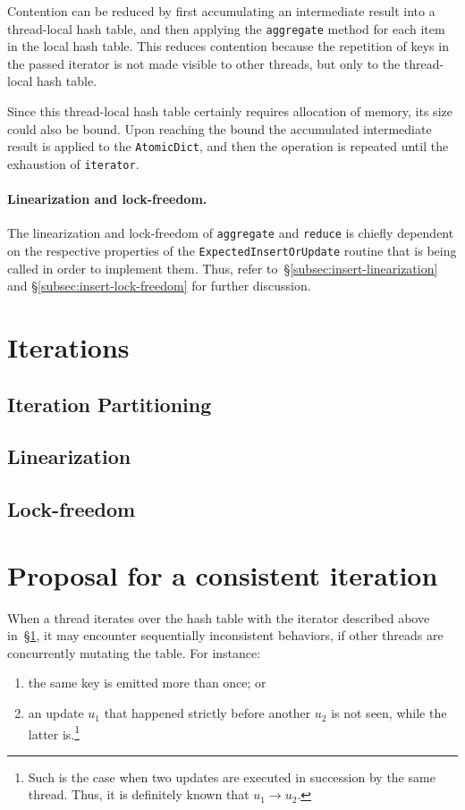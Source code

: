 Contention can be reduced by first accumulating an intermediate result into a thread-local hash table, and then applying the \texttt{aggregate} method for each item in the local hash table.
This reduces contention because the repetition of keys in the passed iterator is not made visible to other threads, but only to the thread-local hash table.

Since this thread-local hash table certainly requires allocation of memory, its size could also be bound.
Upon reaching the bound the accumulated intermediate result is applied to the \texttt{AtomicDict}, and then the operation is repeated until the exhaustion of \texttt{iterator}.


\paragraph{Linearization and lock-freedom.}
The linearization and lock-freedom of \texttt{aggregate} and \texttt{reduce} is chiefly dependent on the respective properties of the \texttt{ExpectedInsertOrUpdate} routine that is being called in order to implement them.
Thus, refer to~\S\ref{subsec:insert-linearization} and \S\ref{subsec:insert-lock-freedom} for further discussion.


\section{Iterations}\label{sec:partitioned-iterations}

\subsection{Iteration Partitioning}\label{subsec:iteration-partitioning}

\subsection{Linearization}\label{subsec:iter-linearization}

\subsection{Lock-freedom}

\section{Proposal for a consistent iteration}\label{sec:consistent-iteration}

When a thread iterates over the hash table with the iterator described above in~\S\ref{sec:partitioned-iterations}, it may encounter sequentially inconsistent behaviors, if other threads are concurrently mutating the table.
For instance:
\begin{enumerate}
	\item the same key is emitted more than once; or
	\item an update $u_1$ that happened strictly before another $u_2$ is not seen, while the latter is.\footnote{%
		Such is the case when two updates are executed in succession by the same thread.
		Thus, it is definitely known that $u_1 \rightarrow u_2$.
	}
\end{enumerate}

